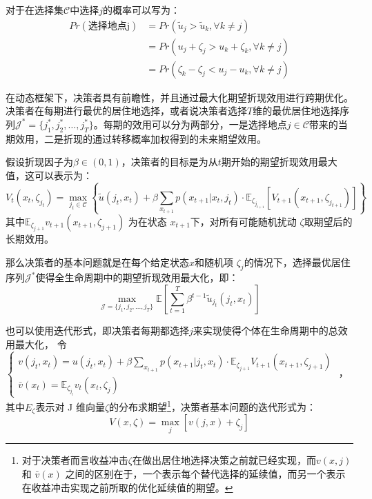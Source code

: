 \documentclass[a4paper,12pt,oneside, fontset=mac]{ctexbook} %
\begin{document}
对于在选择集$\mathcal{C}$中选择$j$的概率可以写为：
\begin{equation}
\begin{split}
  Pr(\text{选择地点j})&=Pr(\tilde u_j > \tilde u_k, \forall k \neq j)
  \\&=Pr(u_j+\zeta_j>u_k+\zeta_k, \forall k \neq j)
  \\&=Pr(\zeta_k-\zeta_j<u_j-u_k, \forall k \neq j)
\end{split}
\label{eq:C中地点选择j的概率}
\end{equation}

在动态框架下，决策者具有前瞻性，并且通过最大化期望折现效用进行跨期优化。决策者在每期进行最优的居住地选择，或者说决策者选择$T$维的最优居住地选择序列$\mathcal{J}^*=\{j_1^*,j_2^*,\ldots,j_T^*\}$。每期的效用可以分为两部分，一是选择地点$j \in \mathcal{C}$带来的当期效用，二是折现的通过转移概率加权得到的未来期望效用。

假设折现因子为$\beta \in (0,1)$，决策者的目标是为从$t$期开始的期望折现效用最大值，这可以表示为：
\begin{equation}
  V_t(x_t, \zeta_{j_t}) = \max_{j_t \in \mathcal{C}} 
  \left\{ 
  \tilde{u}(j_t, x_t) + \beta \sum_{x_{t+1}} p(x_{t+1} | x_t, j_t) \cdot \mathbb{E}_{\zeta_{j_{t+1}}} [ V_{t+1}(x_{t+1}, \zeta_{j_{t+1}}) ]
  \right\}
\end{equation}
其中$\mathbb{E}_{\zeta_{j+1}} v_{t+1}(x_{t+1},\zeta_{j+1})$
为在状态 
$x_{t+1}$下，对所有可能随机扰动 
$\zeta$取期望后的长期效用。

那么决策者的基本问题就是在每个给定状态$x$和随机项 $\zeta_j$的情况下，选择最优居住序列$\mathcal{J}^*$使得全生命周期中的期望折现效用最大化，即：
\begin{equation}
  \max_{\mathcal{J}=\{j_1,j_2,\ldots,j_T\}} \mathbb{E} [ \sum_{t=1}^{T} \beta^{t-1} \tilde{u}_{j_t}(j_t,x_t) ]
\end{equation}

也可以使用迭代形式，即决策者每期都选择$j$来实现使得个体在生命周期中的总效用最大化，
令
$\begin{cases}
  v(j_{t},x_{t})=u(j_{t} ,x_{t})+\beta \sum_{x_{t+1}} p(x_{t+1}|j_t,x_t) \cdot \mathbb{E}_{\zeta_{j+1}} V_{t+1}(x_{t+1},\zeta_{j+1})
  \\
  \bar v(x_{t})=\mathbb{E}_{\zeta_{j_t}} v_{t}(x_{t},\zeta_{j})
\end{cases}$
，其中$E_{\zeta}$表示对 J 维向量$\zeta$的分布求期望\footnote{对于决策者而言收益冲击$\zeta$在做出居住地选择决策之前就已经实现，而$v(x,j)$ 和 $\bar v(x)$ 之间的区别在于，一个表示每个替代选择的延续值，而另一个表示在收益冲击实现之前所取的优化延续值的期望。}，决策者基本问题的迭代形式为：
\begin{equation}
V(x,\zeta)=\max\limits_{j}[v(j,x)+\zeta_{j}]
\end{equation}
\end{document}
